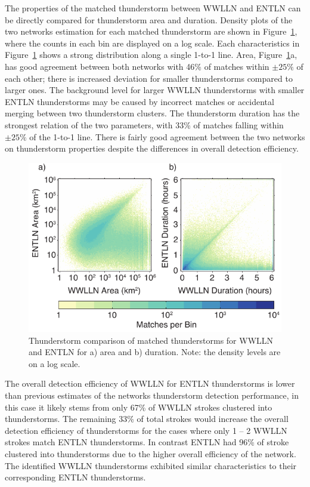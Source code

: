 The properties of the matched thunderstorm  between WWLLN and ENTLN can be directly compared for thunderstorm area and duration.
Density plots of the two networks estimation for each matched thunderstorm are shown in Figure~\ref{thunderstorm:fig:deSim}, where the counts in each bin are displayed on a log scale.
Each characteristics in Figure~\ref{thunderstorm:fig:deSim} shows a strong distribution along a single 1-to-1 line.
Area, Figure~\ref{thunderstorm:fig:deSim}a, has good agreement between both networks with 46\% of matches within $\pm25\%$ of each other; there is increased deviation for smaller thunderstorms compared to larger ones.
The background level for larger WWLLN thunderstorms with smaller ENTLN thunderstorms may be caused by incorrect matches or accidental merging between two thunderstorm clusters.
The thunderstorm duration has the strongest relation of the two parameters, with 33\% of matches falling within $\pm25\%$ of the 1-to-1 line.
There is fairly good agreement between the two networks on thunderstorm properties despite the differences in overall detection efficiency.

\begin{figure}[ht!]
   \centering
   \includegraphics[scale=1]{thunderstorm/Figures/deSim.pdf}
   \caption{Thunderstorm comparison of matched thunderstorms for WWLLN and ENTLN for a) area and b) duration.
           Note: the density levels are on a log scale.}
   \label{thunderstorm:fig:deSim}
\end{figure}


The overall detection efficiency of WWLLN for ENTLN thunderstorms is lower than previous estimates of the networks thunderstorm detection performance, in this case it likely stems from only 67\% of WWLLN strokes clustered into thunderstorms.
The remaining 33\% of total strokes would increase the overall detection efficiency of thunderstorms for the cases where only 1 -- 2 WWLLN strokes match ENTLN thunderstorms.
In contrast ENTLN had 96\% of stroke clustered into thunderstorms due to the higher overall efficiency of the network.
The identified WWLLN thunderstorms exhibited similar characteristics to their corresponding ENTLN thunderstorms.

